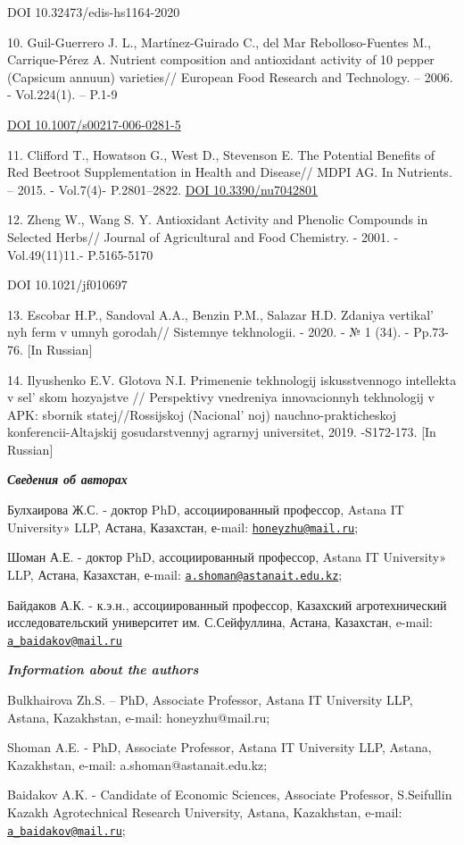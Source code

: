DOI 10.32473/edis-hs1164-2020

10. Guil-Guerrero J. L., Martínez-Guirado C., del Mar Rebolloso-Fuentes
M., Carrique-Pérez A. Nutrient composition and antioxidant activity of
10 pepper (Capsicum annuun) varieties// European Food Research and
Technology. -- 2006. - Vol.224(1). -- P.1-9

\href{https://doi.org/10.1007/s00217-006-0281-5}{DOI
10.1007/s00217-006-0281-5}

11. Clifford T., Howatson G., West D., Stevenson E. The Potential
Benefits of Red Beetroot Supplementation in Health and Disease// MDPI
AG. In Nutrients. -- 2015. - Vol.7(4)- P.2801--2822.
\href{https://doi.org/10.3390/nu7042801}{DOI 10.3390/nu7042801}

12. Zheng W., Wang S. Y. Antioxidant Activity and Phenolic Compounds in
Selected Herbs// Journal of Agricultural and Food Chemistry. - 2001. -
Vol.49(11)11.- P.5165-5170

DOI 10.1021/jf010697

13. Escobar H.P., Sandoval A.A., Benzin P.M., Salazar H.D. Zdaniya
vertikal' nyh ferm v umnyh gorodah// Sistemnye
tekhnologii. - 2020. - № 1 (34). - Pp.73-76. {[}In Russian{]}

14. Ilyushenko E.V. Glotova N.I. Primenenie tekhnologij iskusstvennogo
intellekta v sel' skom hozyajstve // Perspektivy
vnedreniya innovacionnyh tekhnologij v APK: sbornik statej//Rossijskoj
(Nacional' noj) nauchno-prakticheskoj
konferencii-Altajskij gosudarstvennyj agrarnyj universitet,
2019. -S172-173. {[}In Russian{]}

\emph{{\bfseries Сведения об авторах}}

Булхаирова Ж.С. - доктор PhD, ассоциированный профессор, Astana IT
University» LLP, Астана, Казахстан, е-mail:
\href{mailto:honeyzhu@mail.ru}{\nolinkurl{honeyzhu@mail.ru}};

Шоман А.Е. - доктор PhD, ассоциированный профессор, Astana IT
University» LLP, Астана, Казахстан, е-mail:
\href{mailto:a.shoman@astanait.edu.kz}{\nolinkurl{a.shoman@astanait.edu.kz}};

Байдаков А.К. - к.э.н., ассоциированный профессор, Казахский
агротехнический исследовательский университет им. С.Сейфуллина, Астана,
Казахстан, e-mail:
\href{mailto:a_baidakov@mail.ru}{\nolinkurl{a\_baidakov@mail.ru}}

\emph{{\bfseries Information about the authors}}

Bulkhairova Zh.S. -- PhD, Associate Professor, Astana IT University LLP,
Astana, Kazakhstan, e-mail: honeyzhu@mail.ru;

Shoman A.E. - PhD, Associate Professor, Astana IT University LLP,
Astana, Kazakhstan, e-mail: a.shoman@astanait.edu.kz;

Baidakov A.K. - Candidate of Economic Sciences, Associate Professor,
S.Seifullin Kazakh Agrotechnical Research University, Astana,
Kazakhstan, e-mail:
\href{mailto:a_baidakov@mail.ru}{\nolinkurl{a\_baidakov@mail.ru}};\